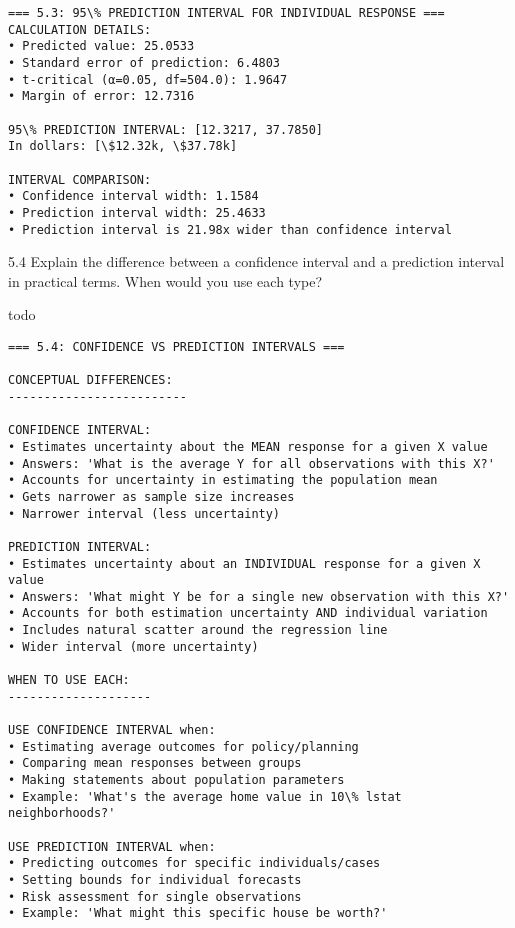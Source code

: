 \documentclass[11pt, twocolumn]{article}
\begin{document}
    \begin{Verbatim}[commandchars=\\\{\}]
=== 5.3: 95\% PREDICTION INTERVAL FOR INDIVIDUAL RESPONSE ===
CALCULATION DETAILS:
• Predicted value: 25.0533
• Standard error of prediction: 6.4803
• t-critical (α=0.05, df=504.0): 1.9647
• Margin of error: 12.7316

95\% PREDICTION INTERVAL: [12.3217, 37.7850]
In dollars: [\$12.32k, \$37.78k]

INTERVAL COMPARISON:
• Confidence interval width: 1.1584
• Prediction interval width: 25.4633
• Prediction interval is 21.98x wider than confidence interval

    \end{Verbatim}

    5.4 Explain the difference between a confidence interval and a
prediction interval in practical terms. When would you use each type?

todo

    \begin{Verbatim}[commandchars=\\\{\}]
=== 5.4: CONFIDENCE VS PREDICTION INTERVALS ===

CONCEPTUAL DIFFERENCES:
-------------------------

CONFIDENCE INTERVAL:
• Estimates uncertainty about the MEAN response for a given X value
• Answers: 'What is the average Y for all observations with this X?'
• Accounts for uncertainty in estimating the population mean
• Gets narrower as sample size increases
• Narrower interval (less uncertainty)

PREDICTION INTERVAL:
• Estimates uncertainty about an INDIVIDUAL response for a given X value
• Answers: 'What might Y be for a single new observation with this X?'
• Accounts for both estimation uncertainty AND individual variation
• Includes natural scatter around the regression line
• Wider interval (more uncertainty)

WHEN TO USE EACH:
--------------------

USE CONFIDENCE INTERVAL when:
• Estimating average outcomes for policy/planning
• Comparing mean responses between groups
• Making statements about population parameters
• Example: 'What's the average home value in 10\% lstat neighborhoods?'

USE PREDICTION INTERVAL when:
• Predicting outcomes for specific individuals/cases
• Setting bounds for individual forecasts
• Risk assessment for single observations
• Example: 'What might this specific house be worth?'

    \end{Verbatim}
\end{document}

